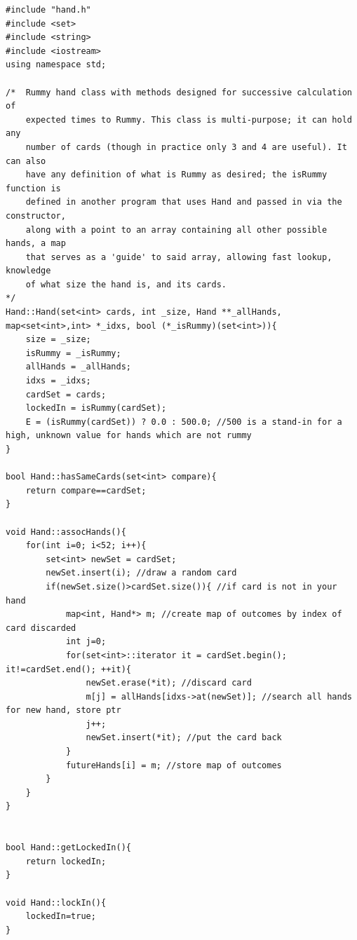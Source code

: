 \documentclass[letter,12pt]{article}
\begin{document}
\begin{scriptsize}
\begin{verbatim}
#include "hand.h"
#include <set>
#include <string>
#include <iostream>
using namespace std;

/*  Rummy hand class with methods designed for successive calculation of 
    expected times to Rummy. This class is multi-purpose; it can hold any
    number of cards (though in practice only 3 and 4 are useful). It can also
    have any definition of what is Rummy as desired; the isRummy function is
    defined in another program that uses Hand and passed in via the constructor,
    along with a point to an array containing all other possible hands, a map
    that serves as a 'guide' to said array, allowing fast lookup, knowledge
    of what size the hand is, and its cards.
*/
Hand::Hand(set<int> cards, int _size, Hand **_allHands, map<set<int>,int> *_idxs, bool (*_isRummy)(set<int>)){
    size = _size;
    isRummy = _isRummy;
    allHands = _allHands;
    idxs = _idxs;
    cardSet = cards;
    lockedIn = isRummy(cardSet);
    E = (isRummy(cardSet)) ? 0.0 : 500.0; //500 is a stand-in for a high, unknown value for hands which are not rummy
}

bool Hand::hasSameCards(set<int> compare){
    return compare==cardSet;
}

void Hand::assocHands(){
    for(int i=0; i<52; i++){
        set<int> newSet = cardSet;
        newSet.insert(i); //draw a random card
        if(newSet.size()>cardSet.size()){ //if card is not in your hand
            map<int, Hand*> m; //create map of outcomes by index of card discarded
            int j=0;
            for(set<int>::iterator it = cardSet.begin(); it!=cardSet.end(); ++it){
                newSet.erase(*it); //discard card
                m[j] = allHands[idxs->at(newSet)]; //search all hands for new hand, store ptr
                j++;
                newSet.insert(*it); //put the card back
            }
            futureHands[i] = m; //store map of outcomes
        }
    }
}


bool Hand::getLockedIn(){
    return lockedIn;
}

void Hand::lockIn(){
    lockedIn=true;
}


\end{verbatim}
\end{scriptsize}
\end{document}
